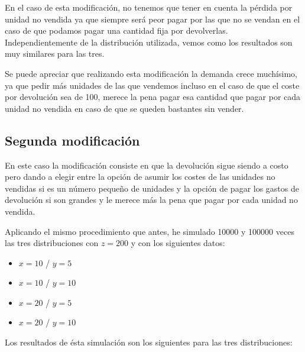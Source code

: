 \documentclass[11pt,a4paper]{report}
\begin{document}
En el caso de esta modificación, no tenemos que tener en cuenta la pérdida por unidad no vendida ya que siempre será peor pagar por las que no se vendan en el caso de que podamos pagar una cantidad fija por devolverlas. Independientemente de la distribución utilizada, vemos como los resultados son muy similares para las tres.

Se puede apreciar que realizando esta modificación la demanda crece muchísimo, ya que pedir más unidades de las que vendemos incluso en el caso de que el coste por devolución sea de 100, merece la pena pagar esa cantidad que pagar por cada unidad no vendida en caso de que se queden bastantes sin vender.

\newpage

\subsection{Segunda modificación}

En este caso la modificación consiste en que la devolución sigue siendo a costo pero dando a elegir entre la opción de asumir los costes de las unidades no vendidas si es un número pequeño de unidades y la opción de pagar los gastos de devolución si son grandes y le merece más la pena que pagar por cada unidad no vendida.

Aplicando el mismo procedimiento que antes, he simulado 10000 y 100000 veces las tres distribuciones con $z = 200$ y con los siguientes datos: 

\begin{itemize}
	\item{$x = 10$ / $y = 5$}
	\item{$x = 10$ / $y = 10$}
	\item{$x = 20$ / $y = 5$}
	\item{$x = 20$ / $y = 10$}
\end{itemize}

Los resultados de ésta simulación son los siguientes para las tres distribuciones:
\end{document}
